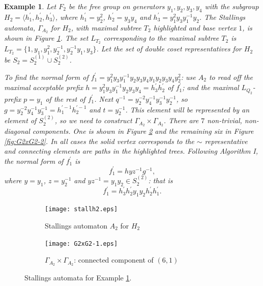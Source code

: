 \documentclass[a4paper,12pt]{article}
\newcommand{\G}{\Gamma }
\newtheorem{exam}[theorem]{Example}
\newenvironment{example}{\begin{exam} \rm}{\end{exam}}
\numberwithin{equation}{section}
\numberwithin{figure}{section}
\newcommand{\la}{\langle}
\newcommand{\ra}{\rangle}
\begin{document}
\begin{example}\label{ex:f_2}
Let $F_2$ be the free group on generators
$y_1,y_2,y_3,y_4$ with the subgroup $H_2 = \la h_1^{\prime},
h_2^{\prime},h_3^{\prime}\ra$, where
$h_1^{\prime}=y_2^2$,
$h_2^{\prime}=y_3y_4$ and
$h_3^{\prime}=y_1^2y_3y_1^{-1}y_2$.
The Stallings automata, $\G_{A_2}$ for $H_2$,
with maximal subtree $T_2$ highlighted and base vertex $1$, is shown
in Figure \ref{fig:stallh2}.
The set $L_{T_2}$ corresponding to the maximal subtree  $T_2$ is
 $L_{T_2}=
\{1, y_1, y_1^2,
y_2^{-1}, y_2^{-1}y_1, y_3 \}$.
Let the set of double coset representatives for $H_2$ be $S_2=S_2^{(1)}
\cup S_2^{(2)}$.

To find the normal form of $f_1^\prime=y_1^2y_3y_1^{-1}y_2y_3y_4y_1y_2
y_3y_4y_2^2$: use ${A_2}$ to read off the maximal acceptable
prefix $h= y_1^2y_3y_1^{-1}y_2y_3y_4=h_3^\prime h_2^\prime$ of $f_1^\prime$; and  the maximal
$L_{Q_2}$-prefix $p=y_1$ of the rest of $f_1^\prime$.  Next $q^{-1}=
y_2^{-2}y_4^{-1}y_3^{-1}y_2^{-1}$, so $g=y_2^{-2}y_4^{-1}y_3^{-1}
=h_1^{\prime -1}h_2^{\prime -1}$
and $t=y_2^{-1}$. This element will be represented by an element
of $S_2^{(2)}$, so we need to construct $\G_{A_2}\times \G_{A_2}$.
There are $7$  non-trivial, non-diagonal components. One is shown
in Figure \ref{fig:G2xG2-1} and the remaining
six in Figure \ref{fig:G2xG2-2}. In all cases the solid vertex
corresponds to the $\sim$ representative and connecting elements
are paths in the highlighted trees. Following Algorithm I, the
normal form of $f_1^\prime$ is
\[f_1^\prime=h yz^{-1} g^{-1},\]
where $y=y_1$, $z=y_2^{-1}$ and $yz^{-1}=y_1y_2\in S_2^{(2)}$: that is
\[f_1^\prime=h^\prime_3h_2^\prime y_1y_2 h_2^\prime h_1^\prime.\]
\end{example}
\begin{figure}
\begin{center}




\begin{subfigure}[b]{.3\columnwidth}
\texttt{[image: stallh2.eps]}
\caption{Stallings automaton $A_2$ for $H_2$}
\label{fig:stallh2}
\end{subfigure}
\hspace{25mm}
\begin{subfigure}[b]{.3\columnwidth}
\texttt{[image: G2xG2-1.eps]}
\caption{$\G_{A_2}\times \G_{A_2}$: connected component of $(6,1)$}
\label{fig:G2xG2-1}
\end{subfigure}
\end{center}
\caption{Stallings automata for Example \ref{ex:f_2}.}\label{fig:stallagain}
\end{figure}
\end{document}
